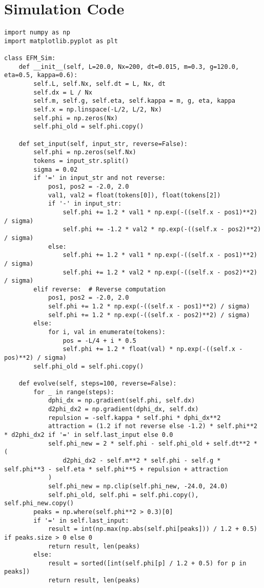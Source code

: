 \documentclass[11pt]{article}
\begin{document}
\appendix
\section{Simulation Code}
\lstset{language=Python, basicstyle=\footnotesize\ttfamily, breaklines=true, numbers=left}
\begin{lstlisting}
import numpy as np
import matplotlib.pyplot as plt

class EFM_Sim:
    def __init__(self, L=20.0, Nx=200, dt=0.015, m=0.3, g=120.0, eta=0.5, kappa=0.6):
        self.L, self.Nx, self.dt = L, Nx, dt
        self.dx = L / Nx
        self.m, self.g, self.eta, self.kappa = m, g, eta, kappa
        self.x = np.linspace(-L/2, L/2, Nx)
        self.phi = np.zeros(Nx)
        self.phi_old = self.phi.copy()

    def set_input(self, input_str, reverse=False):
        self.phi = np.zeros(self.Nx)
        tokens = input_str.split()
        sigma = 0.02
        if '=' in input_str and not reverse:
            pos1, pos2 = -2.0, 2.0
            val1, val2 = float(tokens[0]), float(tokens[2])
            if '-' in input_str:
                self.phi += 1.2 * val1 * np.exp(-((self.x - pos1)**2) / sigma)
                self.phi += -1.2 * val2 * np.exp(-((self.x - pos2)**2) / sigma)
            else:
                self.phi += 1.2 * val1 * np.exp(-((self.x - pos1)**2) / sigma)
                self.phi += 1.2 * val2 * np.exp(-((self.x - pos2)**2) / sigma)
        elif reverse:  # Reverse computation
            pos1, pos2 = -2.0, 2.0
            self.phi += 1.2 * np.exp(-((self.x - pos1)**2) / sigma)
            self.phi += 1.2 * np.exp(-((self.x - pos2)**2) / sigma)
        else:
            for i, val in enumerate(tokens):
                pos = -L/4 + i * 0.5
                self.phi += 1.2 * float(val) * np.exp(-((self.x - pos)**2) / sigma)
        self.phi_old = self.phi.copy()

    def evolve(self, steps=100, reverse=False):
        for _ in range(steps):
            dphi_dx = np.gradient(self.phi, self.dx)
            d2phi_dx2 = np.gradient(dphi_dx, self.dx)
            repulsion = -self.kappa * self.phi * dphi_dx**2
            attraction = (1.2 if not reverse else -1.2) * self.phi**2 * d2phi_dx2 if '=' in self.last_input else 0.0
            self.phi_new = 2 * self.phi - self.phi_old + self.dt**2 * (
                d2phi_dx2 - self.m**2 * self.phi - self.g * self.phi**3 - self.eta * self.phi**5 + repulsion + attraction
            )
            self.phi_new = np.clip(self.phi_new, -24.0, 24.0)
            self.phi_old, self.phi = self.phi.copy(), self.phi_new.copy()
        peaks = np.where(self.phi**2 > 0.3)[0]
        if '=' in self.last_input:
            result = int(np.max(np.abs(self.phi[peaks])) / 1.2 + 0.5) if peaks.size > 0 else 0
            return result, len(peaks)
        else:
            result = sorted([int(self.phi[p] / 1.2 + 0.5) for p in peaks])
            return result, len(peaks)


\end{lstlisting}
\end{document}
